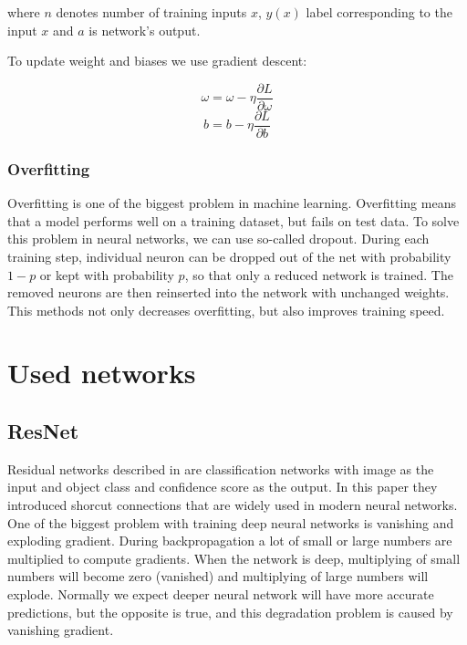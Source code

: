 \documentclass[twoside]{ctuthesis}
\theoremstyle{plain}
\theoremstyle{definition}
\theoremstyle{note}
\begin{document}
where $n$ denotes number of training inputs $x$, $y(x)$ label corresponding to the input $x$ and $a$ is network's output.

To update weight and biases we use gradient descent:

\begin{equation}
\omega = \omega - \eta \frac{\partial L}{\partial \omega}
\end{equation}
\begin{equation}
b = b - \eta \frac{\partial L}{\partial b}
\end{equation}

\subsection{Overfitting}

Overfitting is one of the biggest problem in machine learning. Overfitting means that a model performs well on a training dataset, but fails on test data. To solve this problem in neural networks, we can use so-called dropout. During each training step, individual neuron can be dropped out of the net with probability $1 - p$ or kept with probability $p$, so that only a reduced network is trained. The removed neurons are then reinserted into the network with unchanged weights. This methods not only decreases overfitting, but also improves training speed. 

\chapter{Used networks}
\section{ResNet}

Residual networks described in \cite{he_zhang_ren_sun_2016} are classification networks with image as the input and object class and confidence score as the output. In this paper they introduced shorcut connections that are widely used in modern neural networks.  One of the biggest problem with training deep neural networks is vanishing and exploding gradient. During backpropagation a lot of small or large numbers are multiplied to compute gradients. When the network is deep, multiplying of small numbers will become zero (vanished) and multiplying of large numbers will explode. Normally we expect deeper neural network will have more accurate predictions, but the opposite is true, and this degradation problem is caused by vanishing gradient.
\end{document}
